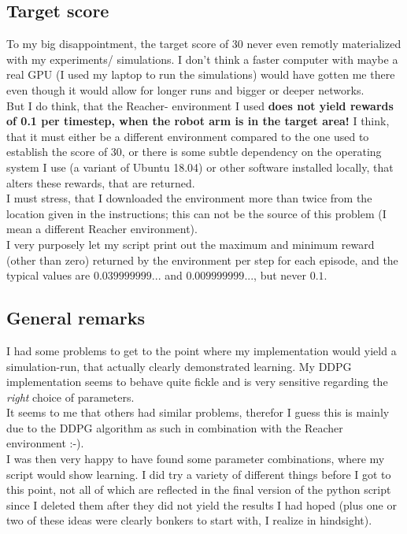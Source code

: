 \documentclass[a4paper]{article}
\begin{document}
\subsection{Target score}
To my big disappointment, the target score of 30 never even remotly materialized
with my experiments/ simulations. I don't think a faster computer with maybe
a real GPU (I used my laptop to run the simulations) would have gotten me there
even though it would allow for longer runs and bigger or deeper networks.
\\
But I do think, that the Reacher- environment I used \textbf{does not yield
rewards of 0.1 per timestep, when the robot arm is in the target area!}
I think, that it must either be a different environment compared to the one
used to establish the score of 30, or there is some subtle dependency on
the operating system I use (a variant of Ubuntu 18.04) or other software
installed locally, that alters these rewards, that are returned.
\\
I must stress, that I downloaded the environment more than twice from the
location given in the instructions; this can not be the source of this problem
(I mean a different Reacher environment).
\\
I very purposely let my script print out the maximum and minimum reward
(other than zero) returned by the environment per step for each episode,
and the typical values are $0.039999999...$ and $0.009999999...$, but never $0.1$.

\subsection{General remarks}
I had some problems to get to the point where my implementation would yield
a simulation-run, that actually clearly demonstrated learning. My DDPG implementation
seems to behave quite fickle and is very sensitive regarding the \textit{right}
choice of parameters.\\
It seems to me that others had similar problems, therefor I guess this is
mainly due to the DDPG algorithm as such in combination with the Reacher environment :-).
\\
I was then very happy to have found some parameter combinations, where my
script would show learning. I did try a variety of different things before
I got to this point, not all of which are reflected in the final version
of the python script since I deleted them after they did not yield
the results I had hoped (plus one or two of these ideas were clearly bonkers
to start with, I realize in hindsight).
\end{document}
